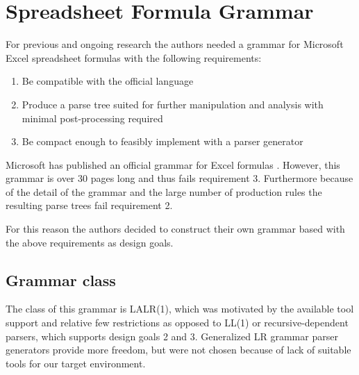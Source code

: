 \documentclass[conference]{IEEEtran}
\begin{document}
\section{Spreadsheet Formula Grammar}
\label{section:grammar}

For previous and ongoing research the authors needed a grammar for Microsoft Excel spreadsheet formulas with the following requirements:

\label{sec:designgoals}
\begin{enumerate}
\item Be compatible with the official language
\item Produce a parse tree suited for further manipulation and analysis with minimal post-processing required
\item Be compact enough to feasibly implement with a parser generator
\end{enumerate}

Microsoft has published an official grammar for Excel formulas \cite{ExcelOfficialGrammar}.
However, this grammar is over 30 pages long and thus fails requirement 3.
Furthermore because of the detail of the grammar and the large number of production rules the resulting parse trees fail requirement 2.

For this reason the authors decided to construct their own grammar based with the above requirements as design goals.

\subsection{Grammar class}

The class of this grammar is LALR(1), which was motivated by the available tool support and relative few restrictions as opposed to LL(1) or recursive-dependent parsers, which supports design goals 2 and 3.
Generalized LR grammar parser generators provide more freedom, but were not chosen because of lack of suitable tools for our target environment.
\end{document}
